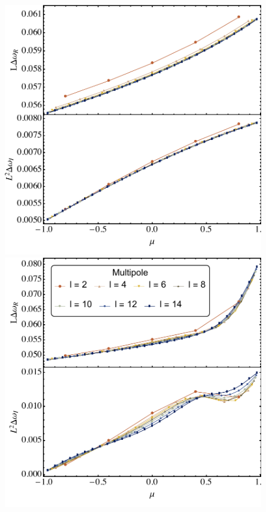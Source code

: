 \begin{refsection}
\begin{figure}[tb]
\label{fig:eikonal}
\includegraphics[width =1.0 \columnwidth]{chapter_extremal/etc/eikplot_Q_8_a_2_s_1.pdf}
\includegraphics[width =1.0 \columnwidth]{chapter_extremal/etc/eikplot_Q_1_a_9_s_1.pdf} \\

\end{figure}
\end{refsection}
